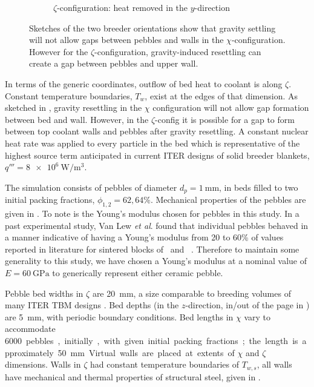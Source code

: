 \begin{figure}[!ht]
\begin{subfigure}[b]{0.44\textwidth}
        \caption{$\zeta$-configuration: heat removed in the $y$-direction}\label{fig:y-domain}
    \end{subfigure}
    \caption{Sketches of the two breeder orientations show that gravity settling will not allow gaps between pebbles and walls in the $\chi$-configuration. However for the $\zeta$-configuration, gravity-induced resettling can create a gap between pebbles and upper wall. }\label{fig:domains}
\end{figure}

In terms of the generic coordinates, outflow of bed heat to coolant is along $\zeta$. Constant temperature boundaries, $T_w$, exist at the edges of that dimension. As sketched in , gravity resettling in the $\chi$ configuration will not allow gap formation between bed and wall. However, in the $\zeta$-config it is possible for a gap to form between top coolant walls and pebbles after gravity resettling. A constant nuclear heat rate was applied to every particle in the bed which is representative of the highest source term anticipated in current ITER designs of solid breeder blankets, $q''' = \SI{8e6}{\watt\per\meter\cubed}$.

The simulation consists of pebbles of diameter $d_p = \SI{1}{\milli\meter}$, in beds filled to two initial packing fractions, $\phi_{1,2} = 62, 64\%$. Mechanical properties of the pebbles are given in . To note is the Young's modulus chosen for pebbles in this study. In a past experimental study, Van Lew \textit{et al}. found that individual pebbles behaved in a manner indicative of having a Young's modulus from 20 to 60\% of values reported in literature for sintered blocks of \lit~and \lis~\cite{VanLew2015}. Therefore to maintain some generality to this study, we have chosen a Young's modulus at a nominal value of $E=\SI{60}{\giga\pascal}$ to generically represent either ceramic pebble.

Pebble bed widths in $\zeta$ are \SI{20}{\milli\meter}, a size comparable to breeding volumes of many ITER TBM designs \cite{Hernandez2013,Cho2008,Feng2012a}. Bed depths (in the $z$-direction, in/out of the page in ) are \SI{5}{\milli\meter}, with periodic boundary conditions. Bed lengths in $\chi$ vary to accommodate \SI{6000} pebbles, initially, with given initial packing fractions; the length is approximately \SI{50}{\milli\meter}. Virtual walls are placed at extents of $\chi$ and $\zeta$ dimensions. Walls in $\zeta$ had constant temperature boundaries of $T_{w,s}$, all walls have mechanical and thermal properties of structural steel, given in .

